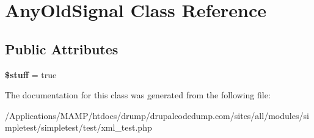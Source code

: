 \hypertarget{class_any_old_signal}{
\section{AnyOldSignal Class Reference}
\label{class_any_old_signal}
}
\subsection*{Public Attributes}
\begin{DoxyCompactItemize}
\item 
\hypertarget{class_any_old_signal_ae6a3bf81f110168394e6008370244598}{
{\bfseries \$stuff} = true}
\label{class_any_old_signal_ae6a3bf81f110168394e6008370244598}

\end{DoxyCompactItemize}


The documentation for this class was generated from the following file:\begin{DoxyCompactItemize}
\item 
/Applications/MAMP/htdocs/drump/drupalcodedump.com/sites/all/modules/simpletest/simpletest/test/xml\_\-test.php\end{DoxyCompactItemize}
